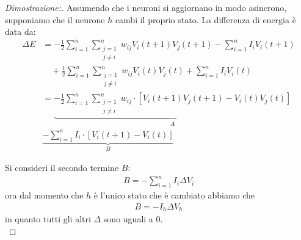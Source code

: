 \begin{proof}[Dimostrazione:]
    Assumendo che i neuroni si aggiornano in modo asincrono, supponiamo che il neurone $h$ cambi il proprio stato. La differenza di energia è data da:
    \begin{align*}
            \Delta E &= - \frac{1}{2} \sum_{i=1}^n \sum_{\substack{j=1 \\ j \neq i}}^n w_{ij} V_i(t + 1) V_j(t + 1) - \sum_{i=1}^n I_i V_i(t + 1) \\
            & \quad + \frac{1}{2} \sum_{i=1}^n \sum_{\substack{j=1 \\ j \neq i}}^n w_{ij} V_i(t) V_j(t) + \sum_{i=1}^n I_i V_i(t) \\
            &= \underbrace{- \frac{1}{2} \sum_{i=1}^n \sum_{\substack{j=1 \\ j \neq i}}^n w_{ij} \cdot [V_i(t + 1) V_j(t + 1) - V_i(t) V_j(t)]}_\textbf{$A$} \\
            & \underbrace{- \sum_{i=1}^n I_i \cdot [V_i(t + 1) - V_i(t)]}_\textbf{$B$}
    \end{align*}
    
    \newpage
    
    Si consideri il secondo termine $B$:
    \begin{align*}
        B = - \sum_{i=1}^n I_i \Delta V_i
    \end{align*}
    ora dal momento che $h$ è l'unico stato che è cambiato abbiamo che
    \begin{align*}
        B = - I_h \Delta V_h
    \end{align*}
    in quanto tutti gli altri $\Delta$ sono uguali a 0.\\
    

\end{proof}
